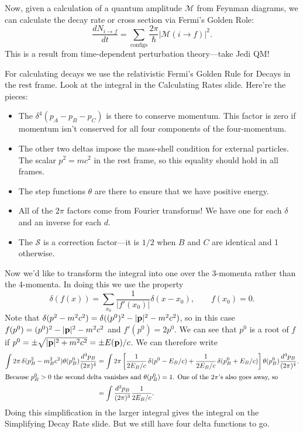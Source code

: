 \documentclass[../p164main.tex]{subfiles}
\begin{document}
Now, given a calculation of a quantum amplitude $\mathcal M$ from Feynman diagrams, we can calculate the decay rate or cross section via Fermi's Golden Role:
\[ \frac{dN_{i \to f}}{dt} = \sum_{\text{configs}}^{} \frac{2\pi}{\hbar} |\mathcal M(i \to f)|^2. \]
This is a result from time-dependent perturbation theory---take Jedi QM!

For calculating decays we use the relativistic Fermi's Golden Rule for Decays in the rest frame.
Look at the integral in the Calculating Rates slide.
Here're the pieces:
\begin{itemize}[topsep=0pt]
    \item The $\delta^{4}(p_A - p_B - p_C)$ is there to conserve momentum.
    This factor is zero if momentum isn't conserved for all four components of the four-momentum.

    \item The other two deltas impose the mass-shell condition for external particles.
    The scalar $p^2 = mc^2$ in the rest frame, so this equality should hold in all frames.
    
    \item The step functions $\theta$ are there to ensure that we have positive energy.
    
    \item All of the $2\pi$ factors come from Fourier transforms!
    We have one for each $\delta$ and an inverse for each $d$.

    \item The $\mathcal S$ is a correction factor---it is $1 / 2$ when $B$ and $C$ are identical and 1 otherwise.
\end{itemize}
Now we'd like to transform the integral into one over the 3-momenta rather than the 4-momenta.
In doing this we use the property
\[ \delta(f(x)) = \sum_{x_0}^{} \frac{1}{|f'(x_0)|} \delta(x - x_0), \qquad f(x_0) = 0. \]
Note that $\delta(p^2 - m^2 c^2) = \delta((p^0)^2 - |\mathbf{p}|^2 - m^2 c^2)$, so in this case $f(p^0) = (p^0)^2 - |\mathbf{p}|^2 - m^2c^2$ and $f'(p^0) = 2p^0$.
We can see that $p^0$ is a root of $f$ if $p^0 = \pm \sqrt{|\mathbf{p}|^2 + m^2 c^2} = \pm E(\mathbf{p}) / c$.
We can therefore write
\begin{align*}
    \int 2\pi \, \delta(p_B^2 - m_B^2 c^2) \theta(p_B^0) \frac{d^4 p_B}{(2\pi)^4} &= \int 2\pi \left[ \frac{1}{2 E_B / c} \,\delta(p^0 - E_B / c) + \frac{1}{2E_B / c} \,\delta(p_B^0 + E_B / c) \right] \theta(p_B^0) \frac{d^4 p_B}{(2\pi)^4}. \\
    \intertext{Because $p_B^0 > 0$ the second delta vanishes and $\theta(p_B^0) = 1$. One of the $2\pi$'s also goes away, so}
    &= \int \frac{d^3 p_B}{(2\pi)^3} \frac{1}{2 E_B / c}.
\end{align*}
Doing this simplification in the larger integral gives the integral on the Simplifying Decay Rate slide.    %
But we still have four delta functions to go.
\end{document}
